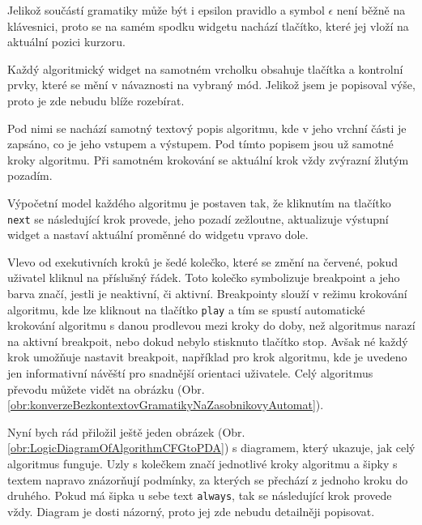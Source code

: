 Jelikož součástí gramatiky může být i epsilon pravidlo a symbol $\epsilon$ není běžně na klávesnici, proto se na samém spodku widgetu nachází tlačítko, které jej vloží na aktuální pozici kurzoru.  



Každý algoritmický widget na samotném vrcholku obsahuje tlačítka a kontrolní prvky, které se mění v návaznosti na vybraný mód. Jelikož jsem je popisoval výše, proto je zde nebudu blíže rozebírat.

Pod nimi se nachází samotný textový popis algoritmu, kde v jeho vrchní části je zapsáno, co je jeho vstupem a výstupem. Pod tímto popisem jsou už samotné kroky algoritmu. Při samotném krokování se aktuální krok vždy zvýrazní žlutým pozadím. 

Výpočetní model každého algoritmu je postaven tak, že kliknutím na tlačítko \texttt{next} se následující krok provede, jeho pozadí zežloutne, aktualizuje výstupní widget a nastaví aktuální proměnné do widgetu vpravo dole. 

Vlevo od exekutivních kroků je šedé kolečko, které se změní na červené, pokud uživatel kliknul na příslušný řádek. Toto kolečko symbolizuje breakpoint a jeho barva značí, jestli je neaktivní, či aktivní. Breakpointy slouží v režimu krokování algoritmu, kde lze kliknout na tlačítko \texttt{play} a tím se spustí automatické krokování algoritmu s danou prodlevou mezi kroky do doby, než algoritmus narazí na aktivní breakpoit, nebo dokud nebylo stisknuto tlačítko stop. Avšak né každý krok umožňuje nastavit breakpoit, například pro krok algoritmu, kde je uvedeno jen informativní návěští pro snadnější orientaci uživatele. Celý algoritmus převodu můžete vidět na obrázku (Obr. \ref{obr:konverzeBezkontextovGramatikyNaZasobnikovyAutomat}).

Nyní bych rád přiložil ještě jeden obrázek (Obr. \ref{obr:LogicDiagramOfAlgorithmCFGtoPDA}) s diagramem, který ukazuje, jak celý algoritmus funguje. Uzly s kolečkem značí jednotlivé kroky algoritmu a šipky s textem napravo znázorňují podmínky, za kterých se přechází z jednoho kroku do druhého. Pokud má šipka u sebe text \texttt{always}, tak se následující krok provede vždy. Diagram je dosti názorný, proto jej zde nebudu detailněji popisovat.


